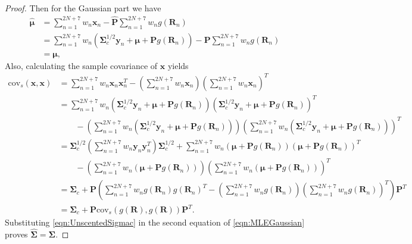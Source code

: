 \documentclass[12pt]{article}
\begin{document}
\begin{proof}
	Then for the Gaussian part we have
	\begin{align}
		\hat{\bm{\mu}} &= \sum_{n=1}^{2N+7}w_n\bm{x}_n-\hat{\mathbf{P}}\sum_{n=1}^{2N+7}w_ng(\mathbf{R}_n) \nonumber \\
		&= \sum_{n=1}^{2N+7}w_n\left(\mathbf{\Sigma}_c^{1/2}\bm{y}_n+\bm{\mu}+\mathbf{P}g(\mathbf{R}_n)\right) - \mathbf{P}\sum_{n=1}^{2N+7}w_ng(\mathbf{R}_n) \nonumber \\
		&= \bm{\mu},
	\end{align}
	Also, calculating the sample covariance of $\bm{x}$ yields 
	\begin{align} \label{eqn:UnscentedSigmac}
		\mathrm{cov}_s(\bm{x},\bm{x}) &= \sum_{n=1}^{2N+7}w_n\bm{x}_n\bm{x}_n^T - \left(\sum_{n=1}^{2N+7}w_n\bm{x}_n\right)\left(\sum_{n=1}^{2N+7}w_n\bm{x}_n\right)^T \nonumber \\
		&= \sum_{n=1}^{2N+7}w_n\left(\mathbf{\Sigma}_c^{1/2}\bm{y}_n+\bm{\mu}+\mathbf{P}g(\mathbf{R}_n)\right)\left(\mathbf{\Sigma}_c^{1/2}\bm{y}_n+\bm{\mu}+\mathbf{P}g(\mathbf{R}_n)\right)^T \nonumber \\
		&\qquad -\left(\sum_{n=1}^{2N+7}w_n\left(\mathbf{\Sigma}_c^{1/2}\bm{y}_n+\bm{\mu}+\mathbf{P}g(\mathbf{R}_n)\right)\right)\left(\sum_{n=1}^{2N+7}w_n\left(\mathbf{\Sigma}_c^{1/2}\bm{y}_n+\bm{\mu}+\mathbf{P}g(\mathbf{R}_n)\right)\right)^T \nonumber \\
		&= \mathbf{\Sigma}_c^{1/2}\left(\sum_{n=1}^{2N+7}w_n\bm{y}_n\bm{y}_n^T\right)\mathbf{\Sigma}_c^{1/2} + \sum_{n=1}^{2N+7}w_n\left(\bm{\mu}+\mathbf{P}g(\mathbf{R}_n)\right)\left(\bm{\mu}+\mathbf{P}g(\mathbf{R}_n)\right)^T \nonumber \\
		&\qquad -\left(\sum_{n=1}^{2N+7}w_n\left(\bm{\mu}+\mathbf{P}g(\mathbf{R}_n)\right)\right)\left(\sum_{n=1}^{2N+7}w_n\left(\bm{\mu}+\mathbf{P}g(\mathbf{R}_n)\right)\right)^T \nonumber \\
		&= \mathbf{\Sigma}_c + \mathbf{P}\left(\sum_{n=1}^{2N+7}w_ng(\mathbf{R}_n)g(\mathbf{R}_n)^T - \left(\sum_{n=1}^{2N+7}w_ng(\mathbf{R}_n)\right)\left(\sum_{n=1}^{2N+7}w_ng(\mathbf{R}_n)\right)^T\right)\mathbf{P}^T \nonumber \\
		&= \mathbf{\Sigma}_c + \mathbf{P}\mathrm{cov}_s(g(\mathbf{R}),g(\mathbf{R}))\mathbf{P}^T.
	\end{align}
	Substituting \eqref{eqn:UnscentedSigmac} in the second equation of \eqref{eqn:MLEGaussian} proves $\hat{\mathbf{\Sigma}} = \mathbf{\Sigma}$.
\end{proof}
\end{document}

